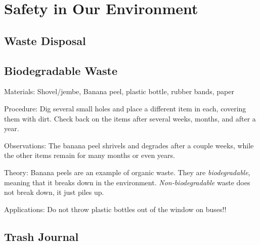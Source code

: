 \section{Safety in Our Environment}

\begin{multicols}{2}


\section*{Waste Disposal}


\subsection{Biodegradable Waste} %


\begin{description*}
\item[Materials:]{Shovel/jembe, Banana peel, plastic bottle, rubber bands, paper}
\item[Procedure:]{Dig several small holes and place a different item in each, covering them with dirt. Check back on the items after several weeks, months, and after a year.}
\item[Observations:]{The banana peel shrivels and degrades after a couple weeks, while the other items remain for many months or even years.}
\item[Theory:]{Banana peels are an example of organic waste. They are \emph{biodegradable}}, meaning that it breaks down in the environment. \emph{Non-biodegradable} waste does not break down, it just piles up.
\item[Applications:]{Do not throw plastic bottles out of the window on buses!!}
\end{description*}

\vfill

\subsection{Trash Journal} %


\end{multicols}
